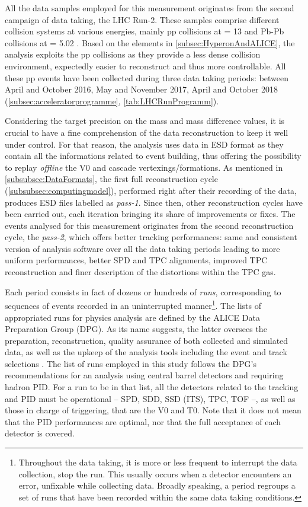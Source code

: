 All the data samples employed for this measurement originates from the second campaign of data taking, the LHC Run-2. These samples comprise different collision systems at various energies, mainly pp collisions at \sqrtS = 13 \tev and Pb-Pb collisions at \sqrtSnn = 5.02 \tev. Based on the elements in \Sec\ref{subsec:HyperonAndALICE}, the analysis exploits the pp collisions as they provide a less dense collision environment, expectedly easier to reconstruct and thus more controllable. All these pp events have been collected during three data taking periods: between April and October 2016, May and November 2017, April and October 2018 (\Sec\ref{subsec:acceleratorprogramme}, \tab\ref{tab:LHCRunProgramm}).

Considering the target precision on the mass and mass difference values, it is crucial to have a fine comprehension of the data reconstruction to keep it well under control. For that reason, the analysis uses data in ESD format as they contain all the informations related to event building, thus offering the possibility to replay \textit{offline} the V0 and cascade vertexings/formations. As mentioned in \Sec\ref{subsubsec:DataFormats}, the first full reconstruction cycle (\Sec\ref{subsubsec:computingmodel}), performed right after their recording of the data, produces ESD files labelled as \textit{pass-1}. Since then, other reconstruction cycles have been carried out, each iteration bringing its share of improvements or fixes. The events analysed for this measurement originates from the second reconstruction cycle, the \emph{pass-2}, which offers better tracking performances: same and consistent version of analysis software over all the data taking periods leading to more uniform performances, better SPD and TPC alignments, improved TPC reconstruction and finer description of the distortions within the TPC gas.

Each period consists in fact of dozens or hundreds of \textit{runs}, corresponding to sequences of events recorded in an uninterrupted manner\footnote{Throughout the data taking, it is more or less frequent to interrupt the data collection, \ie stop the run. This usually occurs when a detector encounters an error, unfixable while collecting data. Broadly speaking, a period regroups a set of runs that have been recorded within the same data taking conditions.}. The lists of appropriated runs for physics analysis are defined by the ALICE Data Preparation Group (DPG). As its name suggests, the latter oversees the preparation, reconstruction, quality assurance of both collected and simulated data, as well as the upkeep of the analysis tools including the event and track selections \cite{alicecollaborationALICEDataPreparation2023}. The list of runs employed in this study follows the DPG's recommendations for an analysis using central barrel detectors and requiring hadron PID. For a run to be in that list, all the detectors related to the tracking and PID must be operational -- \ie SPD, SDD, SSD (ITS), TPC, TOF --, as well as those in charge of triggering, that are the V0 and T0. Note that it does not mean that the PID performances are optimal, nor that the full acceptance of each detector is covered.\\

